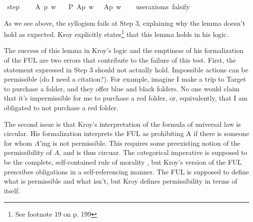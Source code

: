 \begin{isabellebody}
\ step{}{\isacharcolon}\ \isanewline
\ \ \ A\ p\ w\isanewline
\ \ \ {\isachardoublequoteopen}P\ {\isacharbraceleft}A{\isacharparenleft}p{\isacharparenright}{\isacharbraceright}\ w\ {\isasymlongrightarrow}\ {\isacharparenleft}{\isasymdiamond}\ {\isacharparenleft}A{\isacharparenleft}p{\isacharparenright}{\isacharparenright}\ w{\isacharparenright}{\isachardoublequoteclose}\isanewline
\ \ \isamarkupfalse%
\ {\isacharbrackleft}user{\isacharunderscore}axioms{\isacharcomma}\ falsify{\isacharbrackright}%
\isadelimproof
\ %
\endisadelimproof
%
\isatagproof
{}\isamarkupfalse%
\isanewline
%
%
\endisatagproof
{\isafoldproof}%
%
\isadelimproof
%
\endisadelimproof
%
\begin{isamarkuptext}%
As we see above, the syllogism fails at Step 3, explaining why the lemma doesn't 
        hold as expected. Kroy explicitly states\footnote{See footnote 19 on p. 199} that this lemma holds in his logic.

        The success of this lemma in Kroy's logic and the emptiness of his formalization of the FUL are 
        two errors that contribute to the failure of this test. First, the statement expressed in Step 3
        should not actually hold. Impossible actions can be permissible (do I need a citation?). For example, 
        imagine I make a trip to Target to 
        purchase a folder, and they offer blue and black folders. No one would claim that it's impermissible
        for me to purchase a red folder, or, equivalently, that I am obligated to not purchase a red folder.%
\end{isamarkuptext}\isamarkuptrue%
%
\begin{isamarkuptext}%
The second issue is that Kroy's interpretation of the formula of universal law is circular.
        His formalization interprets the FUL as prohibiting A if there is someone for whom 
        $A$'ing is not permissible. This requires some preexisting notion of the permissibility of $A$, and 
        is thus circuar. The categorical imperative is supposed to be the complete,
        self-contained rule of morality \cite{groundwork}, but Kroy's version of the FUL prescribes obligations 
        in a self-referencing manner. The FUL is supposed to define what is permissible and what isn't, 
        but Kroy defines permissibility in terms of itself.
        

\end{isamarkuptext}
\end{isabellebody}
